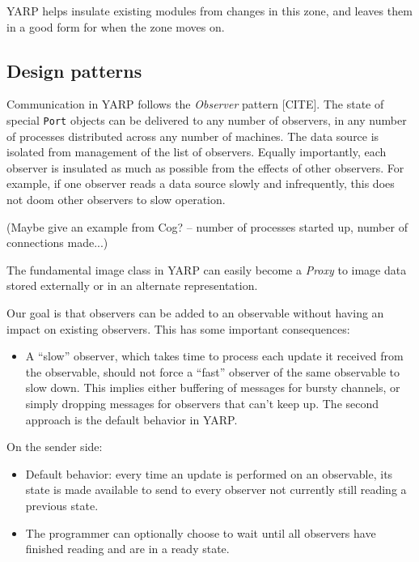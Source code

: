 YARP helps insulate existing modules from changes in this zone,
and leaves them in a good form for when the zone moves on.


\subsection*{Design patterns}

Communication in YARP follows the {\em Observer} pattern [CITE].  The state
of special {\tt Port} objects can be delivered to any number of
observers, in any number of processes distributed across any number of
machines.  The data source is isolated from management of the list
of observers.  Equally importantly, each observer is insulated as
much as possible from the effects of other observers.  For example,
if one observer reads a data source slowly and infrequently, this
does not doom other observers to slow operation.

(Maybe give an example from Cog? -- number of processes started up,
number of connections made...)

The fundamental image class in YARP can easily become a {\em Proxy}
to image data stored externally or in an alternate representation.

Our goal is that observers can be added to an observable without
having an impact on existing observers.  This has some important 
consequences:

\begin{itemize}

\item A ``slow'' observer, which takes time to process each update it
received from the observable, should not force a ``fast'' observer of
the same observable to slow down.  This implies either buffering
of messages for bursty channels, or simply dropping messages for
observers that can't keep up.  The second approach is the default
behavior in YARP.

\end{itemize}


On the sender side:

\begin{itemize}

\item Default behavior: every time an update is performed on an
observable, its state is made available to send to every
observer not currently still reading a previous state.

\item The programmer can optionally choose to wait until all observers
have finished reading and are in a ready state.

\end{itemize}

